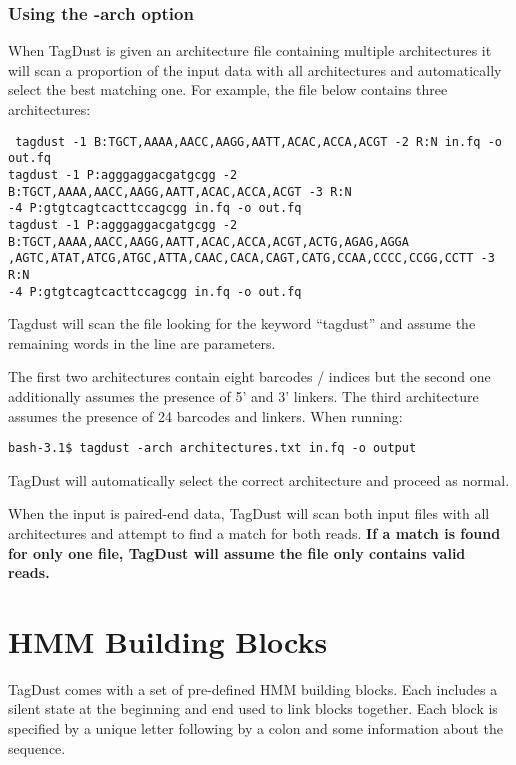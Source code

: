 \documentclass[11pt,a4paper,oneside]{book}
\begin{document}
\subsection{Using the -arch option}

When TagDust is given an architecture file containing multiple architectures it will scan a proportion of the  input data with all architectures and automatically select the best matching one. For example, the file below contains three architectures:

\vspace{5mm}

{\small \tt
tagdust -1 B:TGCT,AAAA,AACC,AAGG,AATT,ACAC,ACCA,ACGT -2 R:N in.fq -o out.fq \\
tagdust -1 P:agggaggacgatgcgg -2 B:TGCT,AAAA,AACC,AAGG,AATT,ACAC,ACCA,ACGT -3 R:N \\ -4 P:gtgtcagtcacttccagcgg in.fq -o out.fq\\
tagdust -1 P:agggaggacgatgcgg -2 B:TGCT,AAAA,AACC,AAGG,AATT,ACAC,ACCA,ACGT,ACTG,AGAG,AGGA\\,AGTC,ATAT,ATCG,ATGC,ATTA,CAAC,CACA,CAGT,CATG,CCAA,CCCC,CCGG,CCTT -3 R:N \\ -4 P:gtgtcagtcacttccagcgg in.fq -o out.fq\\
}

\vspace{5mm}

Tagdust will scan the file looking for the keyword ``tagdust'' and assume the remaining words in the line are parameters. 

The first two architectures contain eight barcodes / indices but the second one additionally assumes the presence of 5' and 3' linkers. The third architecture assumes the presence of 24 barcodes and linkers. When running: 

\begin{verbatim}
bash-3.1$ tagdust -arch architectures.txt in.fq -o output
\end{verbatim}

TagDust will automatically select the correct architecture and proceed as normal. 

When the input is paired-end data, TagDust will scan both input files with all architectures and attempt to find a match for both reads. {\bf If a match is found for only one file, TagDust will assume the file only contains valid reads. }



\newpage

\chapter{HMM Building Blocks}
TagDust comes with a set of pre-defined HMM building blocks. Each includes a silent state at the beginning and end used to link blocks together. Each block is specified by a unique letter following by a colon and some information about the sequence. 
\end{document}
